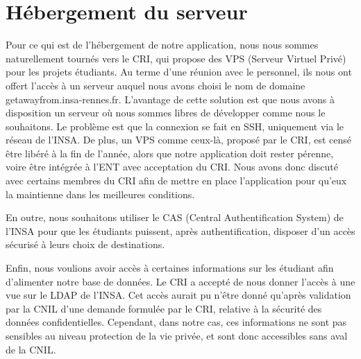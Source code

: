 \section{Hébergement du serveur}

Pour ce qui est de l'hébergement de notre application, nous nous sommes naturellement tournés vers le CRI, qui propose des VPS (Serveur Virtuel Privé) pour les projets étudiants. Au terme d'une réunion avec le personnel, ils nous ont offert l'accès à un serveur auquel nous avons choisi le nom de domaine getawayfrom.insa-rennes.fr. L'avantage de cette solution est que nous avons à disposition un serveur où nous sommes libres de développer comme nous le souhaitons. Le problème est que la connexion se fait en SSH, uniquement via le réseau de l'INSA. De plus, un VPS comme ceux-là, proposé par le CRI, est censé être libéré à la fin de l'année, alors que notre application doit rester pérenne, voire être intégrée à l'ENT avec acceptation du CRI. Nous avons donc discuté avec certains membres du CRI afin de mettre en place l'application pour qu'eux la maintienne dans les meilleures conditions.

En outre, nous souhaitons utiliser le CAS (Central Authentification System) de l'INSA pour que les étudiants puissent, après authentification, disposer d'un accès sécurisé à leurs choix de destinations.

Enfin, nous voulions avoir accès à certaines informations sur les étudiant afin d'alimenter notre base de données. Le CRI a accepté de nous donner l'accès à une vue sur le LDAP de l'INSA. Cet accès aurait pu n'être donné qu'après validation par la CNIL d'une demande formulée par le CRI, relative à la sécurité des données confidentielles. Cependant, dans notre cas, ces informations ne sont pas sensibles au niveau protection de la vie privée, et sont donc accessibles sans aval de la CNIL.